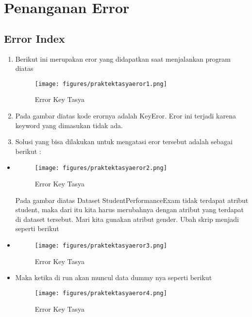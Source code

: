 \section{Penanganan Error}
\subsection{Error Index}
\begin{enumerate}
	\item
Berikut ini merupakan eror yang didapatkan saat menjalankan program diatas
\begin{figure}[ht]
\centering
\texttt{[image: figures/praktektasyaeror1.png]}
\caption{Error Key Tasya }
\label{Error}
\end{figure}
\item
Pada gambar diatas kode erornya adalah KeyEror. Eror ini terjadi karena keyword yang dimasukan tidak ada.
\item
Solusi yang bisa dilakukan untuk mengatasi eror tersebut adalah sebagai berikut :
\end{enumerate}
\begin{itemize}
\item
\begin{figure}[ht]
\centering
\texttt{[image: figures/praktektasyaeror2.png]}
\caption{Error Key Tasya}
\label{Error}
\end{figure}
Pada gambar diatas Dataset StudentPerformanceExam tidak terdapat atribut student, maka dari itu kita harus merubahnya dengan atribut yang terdapat di dataset tersebut. Mari kita gunakan atribut gender. Ubah skrip menjadi seperti berikut
\item
\begin{figure}[ht]
\centering
\texttt{[image: figures/praktektasyaeror3.png]}
\caption{Error Key Tasya}
\label{Error}
\end{figure}
\item Maka ketika di run akan muncul data dummy nya seperti berikut
\begin{figure}[ht]
\centering
\texttt{[image: figures/praktektasyaeror4.png]}
\caption{Error Key Tasya}
\label{Error}
\end{figure}
\end{itemize}

